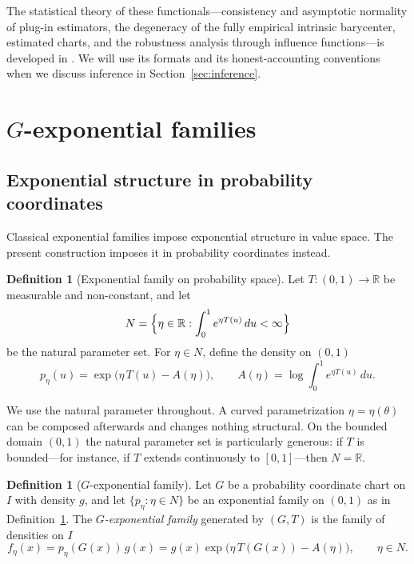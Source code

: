 \documentclass[11pt]{article}
\theoremstyle{definition}
\newtheorem{definition}[theorem]{Definition}
\newcommand{\R}{\mathbb{R}}
\begin{document}
The statistical theory of these functionals---consistency and asymptotic
normality of plug-in estimators, the degeneracy of the fully empirical
intrinsic barycenter, estimated charts, and the robustness analysis through
influence functions---is developed in \cite{Cojocea2026b}. We will use its
formats and its honest-accounting conventions when we discuss inference in
Section~\ref{sec:inference}.

\section{\texorpdfstring{$G$}{G}-exponential families}\label{sec:gexp}

\subsection{Exponential structure in probability coordinates}

Classical exponential families impose exponential structure in value
space. The present construction imposes it in probability coordinates
instead.

\begin{definition}[Exponential family on probability space]
\label{def:expfam01}
Let $T:(0,1)\to\R$ be measurable and non-constant, and let
\[
N=\Bigl\{\eta\in\R:\int_0^1 e^{\eta T(u)}\,du<\infty\Bigr\}
\]
be the natural parameter set. For $\eta\in N$, define the density on
$(0,1)$
\begin{equation}\label{eq:p-eta}
p_\eta(u)=\exp\bigl(\eta\,T(u)-A(\eta)\bigr),
\qquad
A(\eta)=\log\int_0^1 e^{\eta T(u)}\,du .
\end{equation}
\end{definition}

We use the natural parameter throughout. A curved parametrization
$\eta=\eta(\theta)$ can be composed afterwards and changes nothing
structural. On the bounded domain $(0,1)$ the natural parameter
set is particularly generous: if $T$ is bounded---for instance, if $T$
extends continuously to $[0,1]$---then $N=\R$.

\begin{definition}[$G$-exponential family]\label{def:gexp}
Let $G$ be a probability coordinate chart on $I$ with density $g$, and let
$\{p_\eta:\eta\in N\}$ be an exponential family on $(0,1)$ as in
Definition~\ref{def:expfam01}. The \emph{$G$-exponential family} generated
by $(G,T)$ is the family of densities on $I$
\begin{equation}\label{eq:gexp}
f_\eta(x)=p_\eta(G(x))\,g(x)
        =g(x)\exp\bigl(\eta\,T(G(x))-A(\eta)\bigr),
\qquad \eta\in N .
\end{equation}
\end{definition}
\end{document}
